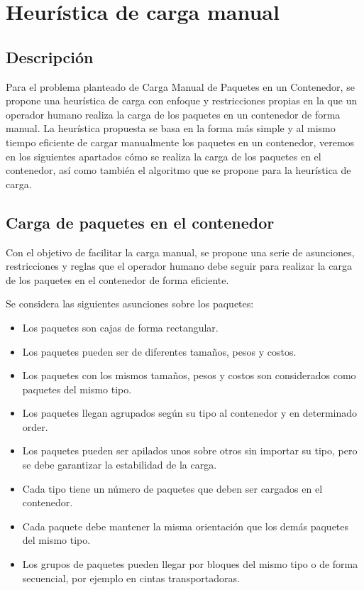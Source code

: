 \section{Heurística de carga manual}

\subsection{Descripción}

Para el problema planteado de Carga Manual de Paquetes en un Contenedor, se propone una heurística de carga con enfoque y restricciones propias en la que un operador humano realiza la carga de los paquetes en un contenedor de forma manual. La heurística propuesta se basa en la forma más simple y al mismo tiempo eficiente de cargar manualmente los paquetes en un contenedor, veremos en los siguientes apartados cómo se realiza la carga de los paquetes en el contenedor, así como también el algoritmo que se propone para la heurística de carga.

\subsection{Carga de paquetes en el contenedor}

Con el objetivo de facilitar la carga manual, se propone una serie de asunciones, restricciones y reglas que el operador humano debe seguir para realizar la carga de los paquetes en el contenedor de forma eficiente.

Se considera las siguientes asunciones sobre los paquetes:

\begin{itemize}
    \item Los paquetes son cajas de forma rectangular.
    \item Los paquetes pueden ser de diferentes tamaños, pesos y costos.
    \item Los paquetes con los mismos tamaños, pesos y costos son considerados como paquetes del mismo tipo.
    \item Los paquetes llegan agrupados según su tipo al contenedor y en determinado order.
    \item Los paquetes pueden ser apilados unos sobre otros sin importar su tipo, pero se debe garantizar la estabilidad de la carga.
    \item Cada tipo tiene un número de paquetes que deben ser cargados en el contenedor.
    \item Cada paquete debe mantener la misma orientación que los demás paquetes del mismo tipo.
    \item Los grupos de paquetes pueden llegar por bloques del mismo tipo o de forma secuencial, por ejemplo en cintas transportadoras.
\end{itemize}

